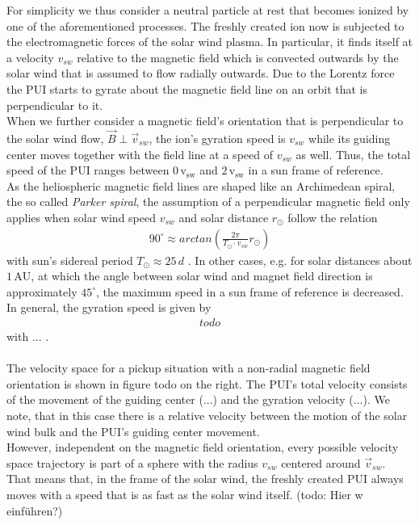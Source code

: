 For simplicity we thus consider a neutral particle at rest that becomes ionized by one of the aforementioned processes. The freshly created ion now is subjected to the electromagnetic forces of the solar wind plasma. In particular, it finds itself at a velocity $v_{sw}$ relative to the magnetic field which is convected outwards by the solar wind that is assumed to flow radially outwards. Due to the Lorentz force the PUI starts to gyrate about the magnetic field line on an orbit that is perpendicular to it. \\
When we further consider a magnetic field's orientation that is perpendicular to the solar wind flow, $\vec{B} \perp \vec{v}_{sw}$, the ion's gyration speed is $v_{sw}$ while its guiding center moves together with the field line at a speed of $v_{sw}$ as well.
Thus, the total speed of the PUI ranges between $0\, \mathrm{v_{sw}} $ and $2 \, \mathrm{v_{sw}}$ in a sun frame of reference. \\
As the heliospheric magnetic field lines are shaped like an Archimedean spiral, the so called \textit{Parker spiral}, the assumption of a perpendicular magnetic field only applies when solar wind speed $v_{sw}$ and solar distance $r_\odot$ follow the relation
\begin{align*}
90 ^\circ \approx  arctan \left( \frac{2\pi}{T_\odot \cdot v_{sw}} r_\odot \right)
\end{align*}
with sun's sidereal period $T_\odot \approx 25\,d$ \citep{prlss_2004}.
In other cases, e.g. for solar distances about $1\,\mathrm{AU}$, at which the angle between solar wind and magnet field direction is approximately $45^\circ$, the maximum speed in a sun frame of reference is decreased. In general, the gyration speed is given by
\begin{align*}
todo
\end{align*}
with ... .
\\ \\
The velocity space for a pickup situation with a non-radial magnetic field orientation is shown in figure todo on the right.
The PUI's total velocity consists of the movement of the guiding center (...) and the gyration velocity (...). We note, that in this case there is a relative velocity between the motion of the solar wind bulk and the PUI's guiding center movement. 
\\
However, independent on the magnetic field orientation, every possible velocity space trajectory is part of a sphere with the radius $v_{sw}$ centered around $\vec{v}_{sw}$. That means that, in the frame of the solar wind, the freshly created PUI always moves with a speed that is as fast as the solar wind itself. (todo: Hier w einführen?) 
